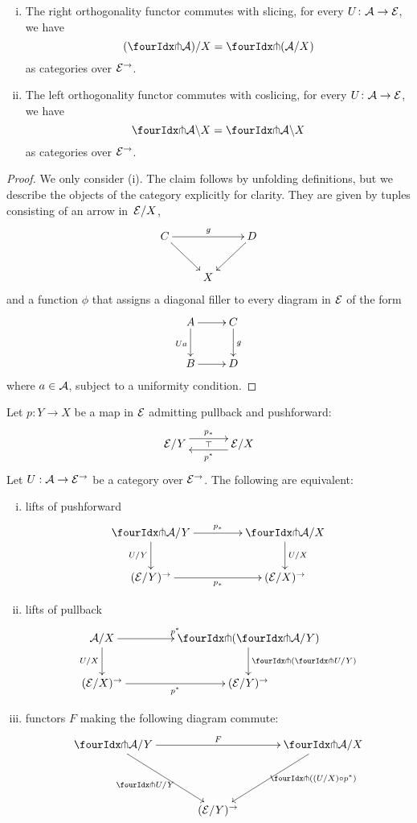 \documentclass[reqno,10pt,a4paper,oneside]{amsart}
\begin{document}
\begin{proposition} \hfill 
\label{pitchfork-slicing}
\begin{enumerate}[(i)]
\item The right orthogonality functor commutes with slicing, \ie for every $U \co \cal{A} \to \cal{E}$, we have
\[
  (\liftr{\cal{A}})/X = \liftr{(\cal{A}/X)}
\]
as categories over $\cal{E}^\to$.
\item The left orthogonality functor commutes with coslicing, \ie for every $U \co \cal{A} \to \cal{E}$, we have
\[
 \liftl{\cal{A}} \backslash X = \liftl{\cal{A} \backslash X}
\]
as categories over $\cal{E}^\to$.
\end{enumerate}
\end{proposition}

\begin{proof} We only consider (i). The claim follows by unfolding definitions, but we describe the objects of the category explicitly for clarity. They are given by 
tuples consisting of an arrow in~$\cal{E}/X$, 
\[
\xymatrix{
C \ar[dr] \ar[rr]^g  &  & D \ar[dl] \\
 & X & }
 \]
and a function $\phi$ that assigns a diagonal filler to every diagram in $\cal{E}$ of the form
\[
\xymatrix{
A \ar[r] \ar[d]_{Ua} & C \ar[d]^g \\
B \ar[r] & D}
\]
where $a \in \cal{A}$, subject to a uniformity condition. 
\end{proof}


\begin{corollary}
\label{lift-dependent-product}
Let $p : Y \to X$ be a map in $\catE$ admitting pullback and pushforward:
\[
\xymatrix@C+1em{
  \catE/Y
  \ar@<5pt>[r]^{p_*}
  \ar@{}[r]|{\top}
&
  \catE/X
  \ar@<5pt>[l]^{p^*}
}
\]
Let $U : \cal{A} \to \catE^{\to}$ be a category over $\catE^{\to}$. The following are
equivalent:
\begin{enumerate}[(i)]
\item lifts of pushforward
\[
\xymatrix@C=1.5cm{
\liftr{\cal{A}}/Y
\ar[r]^{p_*}
  \ar[d]_{U/Y}
&
  \liftr{\cal{A}}/X
  \ar[d]^{U/X}
\\
  (\catE/Y)^{\to}
   \ar[r]_{p_*}
&
  (\catE/X)^{\to}
 }
\]
\item lifts of pullback
\[
\xymatrix@C=1.5cm{
  \cal{A}/X
   \ar[r]^{p^*}
  \ar[d]_{U/X} 
  &
  \liftl{ ( \liftr{\cal{A}}/Y ) }
  \ar[d]^{\liftl{(\liftr{U}/Y)}}
     \\
     (\catE/X)^{\to} \ar[r]_{p^*} &
   (\catE/Y)^{\to} 
}
\]
\item functors $F$ making the following diagram commute:
\[
\xymatrix@C=1.2cm@R=1.5cm{
\liftr{\cal{A}}/Y \ar[rr]^F \ar[dr]_{\liftr{U}/Y} & &  \liftr{\cal{A}}/ X \ar[dl]^(.4){\ \liftr{( (U/X) \cc p^*)}}  \\
 & (\cal{E}/Y)^\to & }
\]
\end{enumerate}
\end{corollary}
\end{document}
